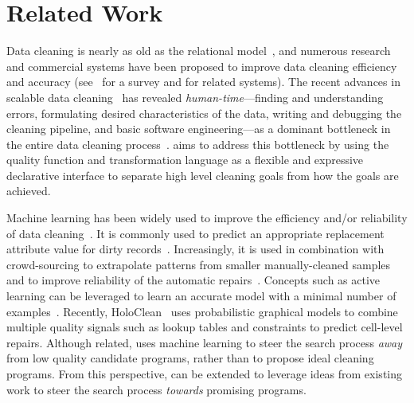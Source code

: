 \section{Related Work}
Data cleaning is nearly as old as the relational model~\cite{codd1970relational}, and numerous research and  commercial systems have been proposed to improve data cleaning efficiency and accuracy (see~\cite{rahm2000data} for a survey and  for related systems).
The recent advances in scalable data cleaning~\cite{wang1999sample, DBLP:journals/debu/KrishnanWFGKM015, khayyat2015bigdansing, altowim2014progressive} has revealed {\it human-time}---finding and understanding errors, formulating desired characteristics of the data, writing and debugging the cleaning pipeline, and basic software engineering---as a dominant bottleneck in the entire data cleaning process~\cite{krishnan2016hilda}.  
\sys aims to address this bottleneck by using the quality function and transformation language as a flexible and expressive declarative interface to separate high level cleaning goals from how the goals are achieved.   



 Machine learning has been widely used to improve the efficiency and/or reliability of data cleaning~\cite{DBLP:journals/pvldb/YakoutENOI11,yakout2013don,gokhale2014corleone}.
It is commonly used to predict an appropriate replacement attribute value for dirty records~\cite{yakout2013don}.
Increasingly, it is used in combination with crowd-sourcing to extrapolate patterns from smaller manually-cleaned samples~\cite{gokhale2014corleone,DBLP:journals/pvldb/YakoutENOI11} and to improve reliability of the automatic repairs~\cite{DBLP:journals/pvldb/YakoutENOI11}.
Concepts such as active learning can be leveraged to learn an accurate model with a minimal number of examples~\cite{DBLP:journals/pvldb/MozafariSFJM14}.
Recently, HoloClean~\cite{rekatsinas2017holoclean} uses probabilistic graphical models to combine multiple quality signals such as lookup tables and constraints to predict cell-level repairs.
Although related, \sys uses machine learning to steer the search process {\it away} from low quality candidate programs, rather than to propose ideal cleaning programs.  From this perspective, \sys can be extended to leverage ideas from existing work to steer the search process {\it towards} promising programs.  

